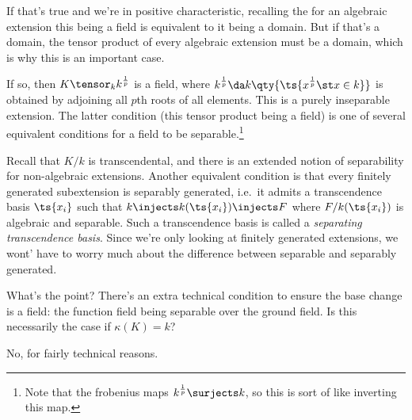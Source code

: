 If that's true and we're in positive characteristic, recalling the for
an algebraic extension this being a field is equivalent to it being a
domain. But if that's a domain, the tensor product of every algebraic
extension must be a domain, which is why this is an important case.

If so, then \(K\tensor_k k^{1\over p}\) is a field, where
\(k^{1\over p} \da k\qty{\ts{x^{1\over p} \st x\in k }}\) is obtained by
adjoining all \(p\)th roots of all elements. This is a purely
inseparable extension. The latter condition (this tensor product being a
field) is one of several equivalent conditions for a field to be
separable.\footnote{Note that the frobenius maps
  \(k^{1\over p} \surjects k\), so this is sort of like inverting this
  map.}

\begin{remark}

Recall that \(K/k\) is transcendental, and there is an extended notion
of separability for non-algebraic extensions. Another equivalent
condition is that every finitely generated subextension is separably
generated, i.e.~it admits a transcendence basis \(\ts{x_i}\) such that
\(k\injects k(\ts{x_i}) \injects F\) where \(F/k(\ts{x_i})\) is
algebraic and separable. Such a transcendence basis is called a
\emph{separating transcendence basis}. Since we're only looking at
finitely generated extensions, we wont' have to worry much about the
difference between separable and separably generated.

\end{remark}

\begin{question}

What's the point? There's an extra technical condition to ensure the
base change is a field: the function field being separable over the
ground field. Is this necessarily the case if \(\kappa(K) = k\)?

\end{question}

\begin{answer}

No, for fairly technical reasons. \lmargnote{\danger}

\end{answer}

